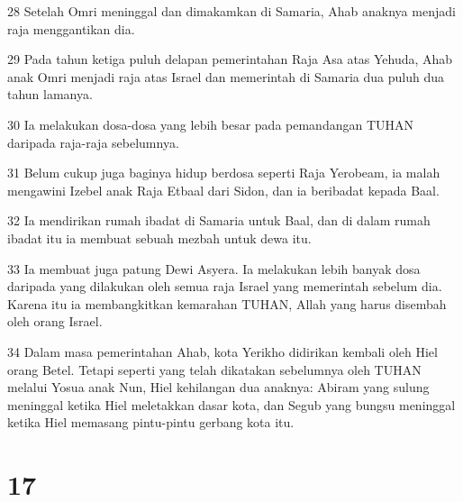 \par 28 Setelah Omri meninggal dan dimakamkan di Samaria, Ahab anaknya menjadi raja menggantikan dia.
\par 29 Pada tahun ketiga puluh delapan pemerintahan Raja Asa atas Yehuda, Ahab anak Omri menjadi raja atas Israel dan memerintah di Samaria dua puluh dua tahun lamanya.
\par 30 Ia melakukan dosa-dosa yang lebih besar pada pemandangan TUHAN daripada raja-raja sebelumnya.
\par 31 Belum cukup juga baginya hidup berdosa seperti Raja Yerobeam, ia malah mengawini Izebel anak Raja Etbaal dari Sidon, dan ia beribadat kepada Baal.
\par 32 Ia mendirikan rumah ibadat di Samaria untuk Baal, dan di dalam rumah ibadat itu ia membuat sebuah mezbah untuk dewa itu.
\par 33 Ia membuat juga patung Dewi Asyera. Ia melakukan lebih banyak dosa daripada yang dilakukan oleh semua raja Israel yang memerintah sebelum dia. Karena itu ia membangkitkan kemarahan TUHAN, Allah yang harus disembah oleh orang Israel.
\par 34 Dalam masa pemerintahan Ahab, kota Yerikho didirikan kembali oleh Hiel orang Betel. Tetapi seperti yang telah dikatakan sebelumnya oleh TUHAN melalui Yosua anak Nun, Hiel kehilangan dua anaknya: Abiram yang sulung meninggal ketika Hiel meletakkan dasar kota, dan Segub yang bungsu meninggal ketika Hiel memasang pintu-pintu gerbang kota itu.

\chapter{17}

